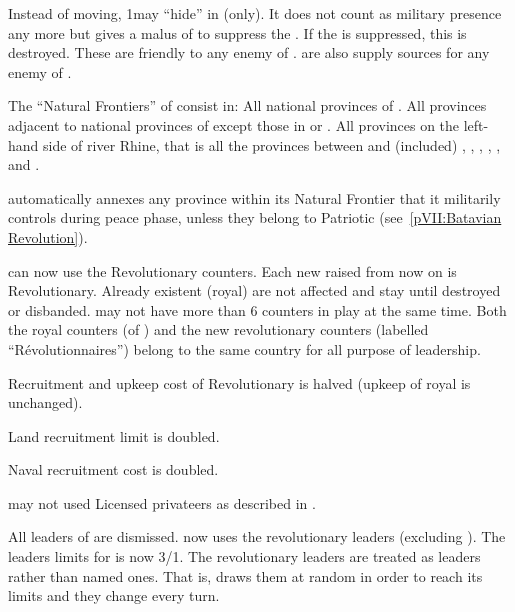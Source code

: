 \begin{digressions}
  \phmil
  \aparag Instead of moving, 1\LD may ``hide'' in \provinceVendee (only). It
  does not count as military presence any more but gives a malus of 
  to suppress the \REBELLION .
  \bparag If the \REBELLION is suppressed, this \LD is destroyed.
  \aparag These \REBELLION are friendly to any enemy of
  \FRA. \REBELLION\Faceplus are also supply sources for any enemy of \FRA.



  \condition{}
  \aparag The ``Natural Frontiers'' of \FRA consist in:
  \bparag All national provinces of \FRA.
  \bparag All provinces adjacent to national provinces of \FRA except those in
  \HIS or \paysSuisse.
  \bparag All provinces on the left-hand side of river Rhine, that is all the
  provinces between \FRA and (included) \provinceAlsace, \provincePfalz,
  \provinceTrier, \provinceKoln, \provinceLimburg, \provinceUtrecht and
  \provinceZeeland.

  \phpaix
  \aparag \FRA automatically annexes any province within its Natural Frontier
  that it militarily controls during peace phase, unless they belong to
  Patriotic \HOL (see~\ref{pVII:Batavian Revolution}).



  \phadm
  \aparag \FRA can now use the Revolutionary \ARMY counters.
  \bparag Each new \ARMY raised from now on is Revolutionary.
  \bparag Already existent (royal) \ARMY are not affected and stay until
  destroyed or disbanded.
  \bparag \FRA may not have more than 6 \ARMY counters in play at the same
  time.
  \bparag Both the royal counters (of \FRA) and the new revolutionary counters
  (labelled ``Révolutionnaires'') belong to the same country for all purpose
  of leadership.

  \aparag Recruitment and upkeep cost of Revolutionary \ARMY is halved (upkeep
  of royal \ARMY is unchanged).

  \aparag Land recruitment limit is doubled.

  \aparag Naval recruitment cost is doubled.

  \aparag \FRA may not used Licensed privateers as described in
  .

  \bparag All leaders of \FRA are dismissed. \FRA now uses the revolutionary
  leaders (excluding \leaderBonaparte).
  \bparag The leaders limits for \FRA is now 3\LeaderG/1\LeaderA.
  \bparag The revolutionary leaders are treated as \anonyme leaders rather
  than named ones. That is, \FRA draws them at random in order to reach
  its limits and they change every turn.


\end{digressions}
